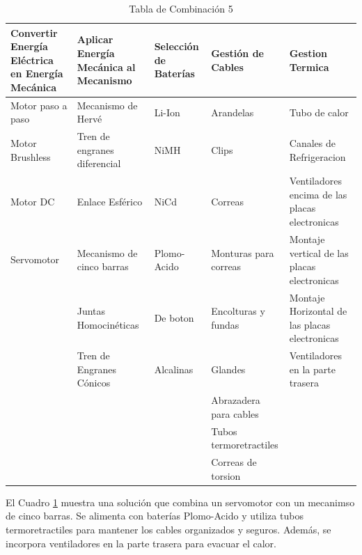    \begin{table}[H]
    \centering
    \begin{tabularx}{\textwidth}{|X|X|X|X|X|}
    \hline
    \textbf{Convertir Energía Eléctrica en Energía Mecánica} & \textbf{Aplicar Energía Mecánica al Mecanismo} & \textbf{Selección de Baterías} & \textbf{Gestión de Cables} & \textbf{Gestion Termica} \\
    \hline
    Motor paso a paso & Mecanismo de Hervé & Li-Ion  & Arandelas & Tubo de calor\\
    \hline
    Motor Brushless & Tren de engranes diferencial & NiMH & Clips & Canales de Refrigeracion \\
    \hline
    Motor DC & Enlace Esférico & NiCd & Correas & Ventiladores encima de las placas electronicas\\
    \hline
    \cellcolor{green}Servomotor & \cellcolor{green}Mecanismo de cinco barras & \cellcolor{green}Plomo-Acido & Monturas para correas & Montaje vertical de las placas electronicas\\
    \hline
     & Juntas Homocinéticas & De boton & Encolturas y fundas & Montaje Horizontal de las placas electronicas\\
    \hline
     & Tren de Engranes Cónicos & Alcalinas & Glandes & \cellcolor{green}Ventiladores en la parte trasera\\
    \hline
     & & & Abrazadera para cables & \\
    \hline
     & & & \cellcolor{green}Tubos termoretractiles & \\
    \hline
     & & & Correas de torsion & \\
    \hline
    \end{tabularx}
    \caption{Tabla de Combinación 5}
    \label{tab:combinacion_5}
    \end{table} 

    El Cuadro \ref{tab:combinacion_5} muestra una solución que combina un servomotor con un mecanimso de cinco barras. Se alimenta con baterías Plomo-Acido y utiliza tubos termoretractiles para mantener los cables organizados y seguros. Además, se incorpora ventiladores en la parte trasera para evacuar el calor.

